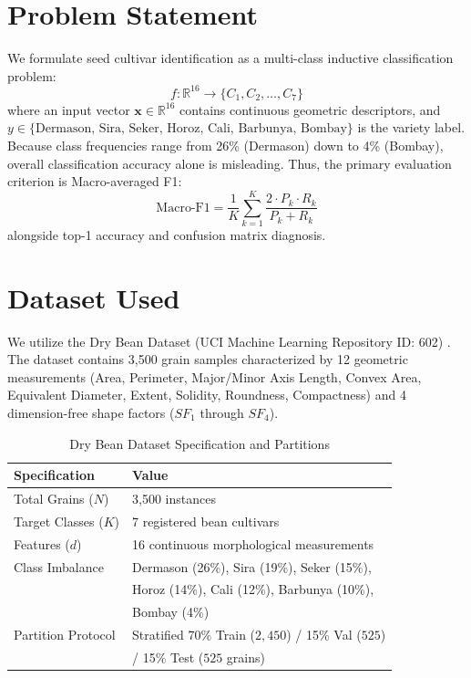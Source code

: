 \documentclass[10pt,journal,compsoc,twocolumn]{IEEEtran}
\begin{document}
\section{Problem Statement}
We formulate seed cultivar identification as a multi-class inductive classification problem:
\begin{equation}
f: \mathbb{R}^{16} \to \{C_1, C_2, \dots, C_7\}
\end{equation}
where an input vector $\mathbf{x} \in \mathbb{R}^{16}$ contains continuous geometric descriptors, and $y \in \{\text{Dermason, Sira, Seker, Horoz, Cali, Barbunya, Bombay}\}$ is the variety label. Because class frequencies range from 26\% (Dermason) down to 4\% (Bombay), overall classification accuracy alone is misleading. Thus, the primary evaluation criterion is Macro-averaged F1:
\begin{equation}
\text{Macro-F1} = \frac{1}{K} \sum_{k=1}^K \frac{2 \cdot P_k \cdot R_k}{P_k + R_k}
\end{equation}
alongside top-1 accuracy and confusion matrix diagnosis.

\section{Dataset Used}
We utilize the Dry Bean Dataset (UCI Machine Learning Repository ID: 602) \cite{koklu2020multiclass}. The dataset contains 3,500 grain samples characterized by 12 geometric measurements (Area, Perimeter, Major/Minor Axis Length, Convex Area, Equivalent Diameter, Extent, Solidity, Roundness, Compactness) and 4 dimension-free shape factors ($SF_1$ through $SF_4$).

\begin{table}[htbp]
\centering
\caption{Dry Bean Dataset Specification and Partitions}
\label{tab:bean_stats}
\begin{tabular}{ll}
\toprule
\textbf{Specification} & \textbf{Value} \\
\midrule
Total Grains ($N$) & 3,500 instances \\
Target Classes ($K$) & 7 registered bean cultivars \\
Features ($d$) & 16 continuous morphological measurements \\
Class Imbalance & Dermason (26\%), Sira (19\%), Seker (15\%), \\
                & Horoz (14\%), Cali (12\%), Barbunya (10\%), \\
                & Bombay (4\%) \\
Partition Protocol & Stratified 70\% Train ($2,450$) / 15\% Val ($525$) \\
                   & / 15\% Test ($525$ grains) \\
\bottomrule
\end{tabular}
\end{table}
\end{document}
